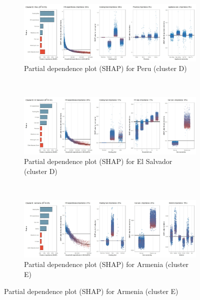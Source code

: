 \begin{figure}[ht!]\ContinuedFloat
    \centering
   \begin{subfigure}[b]{\textwidth}
     \centering
         \caption{Partial dependence plot (SHAP) for Peru (cluster D)}
         \label{fig:5b_PER}
         \includegraphics[width=\textwidth]{Figure 5b/Figure_5b_PER}        
     \end{subfigure}
    \\
    \vspace{0.5cm}
   \begin{subfigure}[b]{\textwidth}
    \centering
         \caption{Partial dependence plot (SHAP) for El Salvador (cluster D)}
         \label{fig:5b_SLV}
         \includegraphics[width=\textwidth]{Figure 5b/Figure_5b_SLV} 
    \end{subfigure}
    \\
    \vspace{0.5cm}
   \begin{subfigure}[b]{\textwidth}     
    \centering
         \caption{Partial dependence plot (SHAP) for Armenia (cluster E)}
         \label{fig:5b_ARM}
         \includegraphics[width=\textwidth]{Figure 5b/Figure_5b_ARM}     

\end{subfigure}
\end{figure}
